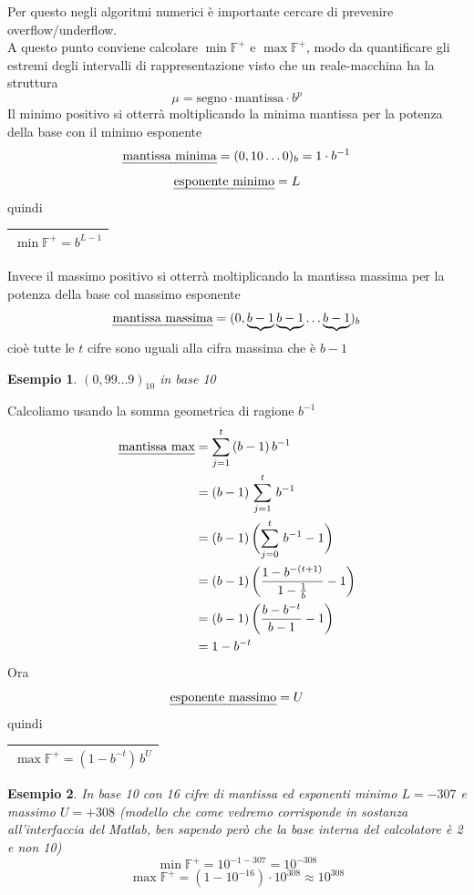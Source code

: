 \documentclass[12pt]{article}
\newtheorem*{esempio}{Esempio}
\begin{document}
Per questo negli algoritmi numerici è importante cercare di prevenire overflow/underflow. \\
A questo punto conviene calcolare $\min \mathbb{F}^+$ e $\max \mathbb{F}^+$, modo da quantificare gli estremi degli intervalli di rappresentazione visto che un reale-macchina ha la struttura 
\[\mu = \text{segno} \cdot \text{mantissa} \cdot b^p\]
Il minimo positivo si otterrà moltiplicando la minima mantissa per la potenza della base con il minimo esponente
\[ \text{\uline{mantissa minima}} = (0,10 \dotsc 0)_b = 1 \cdot b^{-1}\]
\[ \text{\uline{esponente minimo}} = L\]
quindi
\begin{table}[h!]
    \centering
    \begin{tabular}{|c|}
    \hline
        $\min \mathbb{F}^+ = b^{L-1}$ \\
    \hline
    \end{tabular}
\end{table}
Invece il massimo positivo si otterrà moltiplicando la mantissa massima per la potenza della base col massimo esponente
\[ \text{\uline{mantissa massima}} = (0,\underbrace{b-1} \underbrace{b-1} \dotsc \underbrace{b-1})_b\]
cioè tutte le $t$ cifre sono uguali alla cifra massima che è $b-1$
\begin{esempio}
$(0,99 \dotsc 9)_{10}$ in base 10
\end{esempio}
Calcoliamo usando la somma geometrica di ragione $b^{-1}$
\[\begin{split}
    \text{\uline{mantissa max}} & = \sum_{j=1}^t\,(b-1)\,b^{-1} \\
    & = (b-1)\,\sum_{j=1}^t\,b^{-1} \\
    & = (b-1)\,\biggl(\sum_{j=0}^t\,b^{-1} - 1\biggr) \\
    & = (b-1)\,\biggl(\frac{1 - b^{-(t+1)}}{1 - \frac{1}{b}} - 1\biggr) \\
    & = (b-1)\,\biggl(\frac{b - b^{-t}}{b - 1} - 1\biggr) \\
    & = 1 - b^{-t} \\
\end{split}\]
Ora \[ \text{\uline{esponente massimo}} = U\] quindi
\begin{table}[h!]
    \centering
    \begin{tabular}{|c|}
    \hline
        $\max \mathbb{F}^+ = (1 - b^{-t})\,b^U$ \\
    \hline
    \end{tabular}
\end{table}
\begin{esempio} 
In base 10 con 16 cifre di mantissa ed esponenti minimo $L = - 307$ e massimo $U = + 308$ (modello che come vedremo corrisponde in sostanza all'interfaccia del Matlab, ben sapendo però che la base interna del calcolatore è 2 e non 10)
\[ \min \mathbb{F}^+ = 10^{- 1 - 307} = 10^{- 308} \]
\[ \max \mathbb{F}^+ = (1 - 10^{-16})\cdot 10^{308} \approx 10^{308}\]
\end{esempio}
\end{document}
